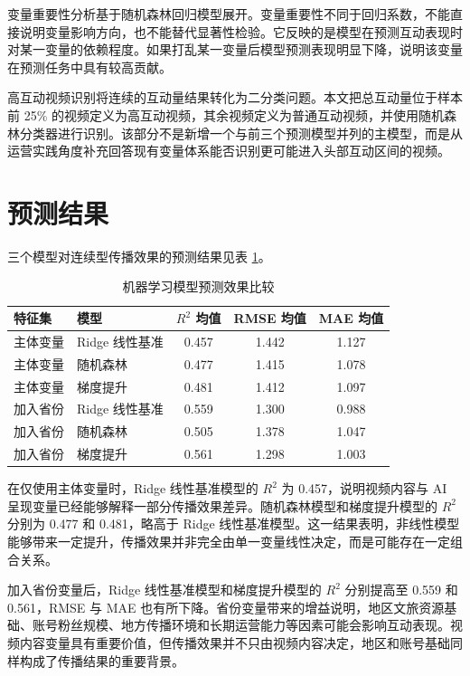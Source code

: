 变量重要性分析基于随机森林回归模型展开。变量重要性不同于回归系数，不能直接说明变量影响方向，也不能替代显著性检验。它反映的是模型在预测互动表现时对某一变量的依赖程度。如果打乱某一变量后模型预测表现明显下降，说明该变量在预测任务中具有较高贡献。

高互动视频识别将连续的互动量结果转化为二分类问题。本文把总互动量位于样本前 25\% 的视频定义为高互动视频，其余视频定义为普通互动视频，并使用随机森林分类器进行识别。该部分不是新增一个与前三个预测模型并列的主模型，而是从运营实践角度补充回答现有变量体系能否识别更可能进入头部互动区间的视频。

\section{预测结果}

三个模型对连续型传播效果的预测结果见表 \ref{tab:mlresult}。

\begin{table}[!htbp]
  \centering
  \caption{机器学习模型预测效果比较}
  \label{tab:mlresult}
  \small
  \begin{tabular}{llccc}
    \toprule
    特征集 & 模型 & $R^2$ 均值 & RMSE 均值 & MAE 均值 \\
    \midrule
    主体变量 & Ridge 线性基准 & 0.457 & 1.442 & 1.127 \\
    主体变量 & 随机森林 & 0.477 & 1.415 & 1.078 \\
    主体变量 & 梯度提升 & 0.481 & 1.412 & 1.097 \\
    加入省份 & Ridge 线性基准 & 0.559 & 1.300 & 0.988 \\
    加入省份 & 随机森林 & 0.505 & 1.378 & 1.047 \\
    加入省份 & 梯度提升 & 0.561 & 1.298 & 1.003 \\
    \bottomrule
  \end{tabular}
\end{table}

在仅使用主体变量时，Ridge 线性基准模型的 $R^2$ 为 0.457，说明视频内容与 AI 呈现变量已经能够解释一部分传播效果差异。随机森林模型和梯度提升模型的 $R^2$ 分别为 0.477 和 0.481，略高于 Ridge 线性基准模型。这一结果表明，非线性模型能够带来一定提升，传播效果并非完全由单一变量线性决定，而是可能存在一定组合关系。

加入省份变量后，Ridge 线性基准模型和梯度提升模型的 $R^2$ 分别提高至 0.559 和 0.561，RMSE 与 MAE 也有所下降。省份变量带来的增益说明，地区文旅资源基础、账号粉丝规模、地方传播环境和长期运营能力等因素可能会影响互动表现。视频内容变量具有重要价值，但传播效果并不只由视频内容决定，地区和账号基础同样构成了传播结果的重要背景。

